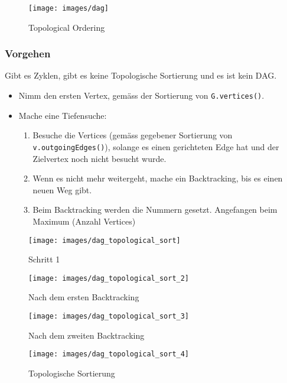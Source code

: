 \begin{figure}[ht!]
	\centering
	\begin{minipage}[t]{0.7\textwidth}
		\centering
		\texttt{[image: images/dag]}
		\caption{Topological Ordering}
		\label{fig:topologicalordering}
	\end{minipage}
\end{figure}

\newpage

\subsubsection{Vorgehen}
Gibt es Zyklen, gibt es keine Topologische Sortierung und es ist kein DAG.
\begin{itemize}
	\item Nimm den ersten Vertex, gemäss der Sortierung von \lstinline|G.vertices()|.
	\item Mache eine Tiefensuche:
	\begin{enumerate}
		\item Besuche die Vertices (gemäss gegebener Sortierung von \lstinline|v.outgoingEdges()|), solange es einen gerichteten Edge hat und der Zielvertex noch nicht besucht wurde. 
		\item Wenn es nicht mehr weitergeht, mache ein Backtracking, bis es einen neuen Weg gibt. 
		\item Beim Backtracking werden die Nummern gesetzt. Angefangen beim Maximum (Anzahl Vertices)
	\end{enumerate}
\end{itemize}

\begin{figure}[ht!]
	\centering
	\begin{minipage}[t]{0.4\textwidth}
		\centering
		\texttt{[image: images/dag\_topological\_sort]}
		\caption{Schritt 1}
		\label{fig:dagtopologicalsort}
	\end{minipage}
	\begin{minipage}[t]{0.4\textwidth}
		\centering
		\texttt{[image: images/dag\_topological\_sort\_2]}
		\caption{Nach dem ersten Backtracking}
		\label{fig:dagtopologicalsort2}
	\end{minipage}
	\begin{minipage}[t]{0.4\textwidth}
			\centering
		\texttt{[image: images/dag\_topological\_sort\_3]}
		\caption{Nach dem zweiten Backtracking}
		\label{fig:dagtopologicalsort3}
	\end{minipage}
	\begin{minipage}[t]{0.4\textwidth}
		\centering
		\texttt{[image: images/dag\_topological\_sort\_4]}
		\caption{Topologische Sortierung}
		\label{fig:dagtopologicalsort4}
\end{minipage}
\end{figure}



